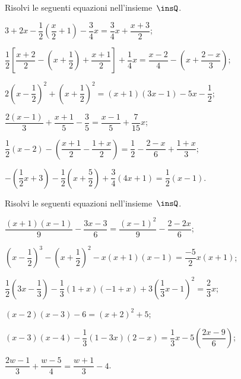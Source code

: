 \begin{esercizio}[\Ast]
\label{ese:15.39}
Risolvi le seguenti equazioni nell'insieme~$\insQ$.
\begin{enumeratea}
\spazielenx
 \item $3+2x-\dfrac{1}{2}\left(\dfrac{x}{2}+1\right)-\dfrac{3}{4}x=\dfrac{3}{4}x+\dfrac{x+3}{2}$;
 \item $\dfrac{1}{2}\left[\dfrac{x+2}{2}-\left(x+\dfrac{1}{2}\right)+\dfrac{x+1}{2}\right]+\dfrac{1}{4}x=\dfrac{x-2}{4}-\left(x+\dfrac{2-x}{3}\right)$;
 \item $2\left(x-\dfrac{1}{2}\right)^{2}+\left(x+\dfrac{1}{2}\right)^{2}=(x+1)(3x-1)-5x-\dfrac{1}{2}$;
 \item $\dfrac{2\left(x-1\right)}{3}+\dfrac{x+1}{5}-\dfrac{3}{5}=\dfrac{x-1}{5}+\dfrac{7}{15}x$;
 \item $\dfrac{1}{2}(x-2)-\left(\dfrac{x+1}{2}-\dfrac{1+x}{2}\right)=\dfrac{1}{2}-\dfrac{2-x}{6}+\dfrac{1+x}{3}$;
 \item $-\left(\dfrac{1}{2}x+3\right)-\dfrac{1}{2}\left(x+\dfrac{5}{2}\right)+\dfrac{3}{4}(4x+1)=\dfrac{1}{2}(x-1)$.
\end{enumeratea}
\end{esercizio}

\begin{esercizio}[\Ast]
\label{ese:15.40}
Risolvi le seguenti equazioni nell'insieme~$\insQ$.
\begin{enumeratea}
\spazielenx
 \item $\dfrac{(x+1)(x-1)}{9}-\dfrac{3x-3}{6}=\dfrac{(x-1)^{2}}{9}-\dfrac{2-2x}{6}$;
 \item $\left(x-\dfrac{1}{2}\right)^{3}-\left(x+\dfrac{1}{2}\right)^{2}-x(x+1)(x-1)=\dfrac{-5}{2}x(x+1)$;
 \item $\dfrac{1}{2}\left(3x-\dfrac{1}{3}\right)-\dfrac{1}{3}(1+x)(-1+x)+3\left(\dfrac{1}{3}x-1\right)^{2}=\dfrac{2}{3}x$;
 \item $(x-2)(x-3)-6=(x+2)^2 +5$;
 \item $(x-3)(x-4)-\dfrac{1}{3}(1-3x)(2-x)=\dfrac{1}{3}x-5\left(\dfrac{2x-9}{6}\right)$;
 \item $\dfrac{2w-1}{3}+\dfrac{w-5}{4}=\dfrac{w+1}{3}-4$.
\end{enumeratea}
\end{esercizio}

